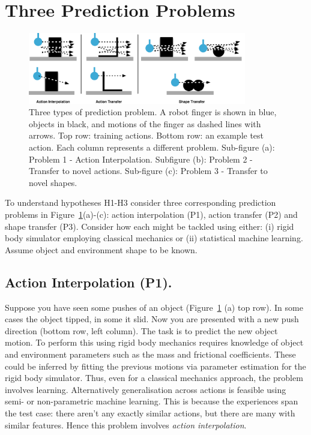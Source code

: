 \section{Three Prediction Problems	}
\label{sec:schema}

\def\stackalignment{l}
\begin{figure}[t]
\centerline{\includegraphics[width=0.85\textwidth]{three-prediction-problems}}
\caption{Three types of prediction problem. A robot finger is shown in blue, objects in black, and motions of the finger as dashed lines with arrows. Top row: training actions. Bottom row: an example test action. Each column represents a different problem. Sub-figure (a): Problem 1 - Action Interpolation. Subfigure (b): Problem 2 - Transfer to novel actions. Sub-figure (c): Problem 3 - Transfer to novel shapes. \label{fig:three-prediction-problems}}

\end{figure}

To understand hypotheses H1-H3 consider three corresponding prediction problems in Figure~\ref{fig:three-prediction-problems}(a)-(c): action interpolation (P1), action transfer (P2) and shape transfer (P3). Consider how each might be tackled using either: (i) rigid body simulator employing classical mechanics or (ii) statistical machine learning. Assume object and environment shape to be known.

\subsection{Action Interpolation (P1).} Suppose you have seen some pushes of an object (Figure~\ref{fig:three-prediction-problems} (a) top row). In some cases the object tipped, in some it slid. Now you are presented with a new push direction (bottom row, left column). The task is to predict the new object motion. To perform this using rigid body mechanics requires knowledge of object and environment parameters such as the mass and frictional coefficients. These could be inferred by fitting the previous motions via parameter estimation for the rigid body simulator. Thus, even for a classical mechanics approach, the problem involves learning. Alternatively generalisation across actions is feasible using semi- or non-parametric machine learning. This is because the experiences span the test case: there aren't any exactly similar actions, but there are many with similar features. Hence this problem involves {\em action interpolation}.


